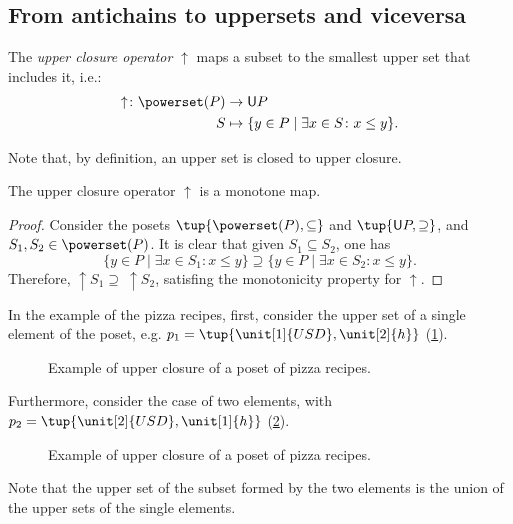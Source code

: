 \subsection{From antichains to uppersets and viceversa}
\begin{definition}
\label{def:upperclosure}
The \emph{upper closure operator} $\uparrow$ maps a subset to the smallest upper set that includes it, i.e.:
\begin{equation}
    \begin{aligned}
    \uparrow \colon \powerset(P)&\to \mathsf{U}P\\
    S&\mapsto \{y\in P \mid \exists x\in S \colon x\leq y\}.
    \end{aligned}
\end{equation}
\end{definition}
\begin{remark}
Note that, by definition, an upper set is closed to upper closure.
\end{remark}

\begin{lemma}
The upper closure operator $\uparrow$ is a monotone map.
\end{lemma}
\begin{proof}
Consider the posets $\tup{\powerset(P),\subseteq}$ and $\tup{\mathsf{U}P,\supseteq}$, and $S_1,S_2\in \powerset(P)$. It is clear that given $S_1\subseteq S_2$, one has
\begin{equation}
    \{y\in P\mid \exists x\in S_1\colon x\leq y\} \supseteq \{y\in P\mid \exists x\in S_2\colon x\leq y\}.
\end{equation}
Therefore, $\uparrow S_1\supseteq \ \uparrow S_2$, satisfing the monotonicity property for $\uparrow$.
\end{proof}

In the example of the pizza recipes, first, consider the upper set of a single element of the poset, e.g. $p_1=\tup{\unit[1]{USD},\unit[2]{h}}$  (\cref{fig:upperclosure_1}).
\begin{figure}[h!]
\begin{center}
\end{center}
\caption{Example of upper closure of a poset of pizza recipes. \label{fig:upperclosure_1}}
\end{figure}
Furthermore, consider the case of two elements, with $p_2=\tup{\unit[2]{USD},\unit[1]{h}}$ (\cref{fig:upperclosure_2}).

\begin{figure}[h!]
\begin{center}
\end{center}
\caption{Example of upper closure of a poset of pizza recipes. \label{fig:upperclosure_2}}
\end{figure}
Note that the upper set of the subset formed by the two elements is the union of the upper sets of the single elements.


